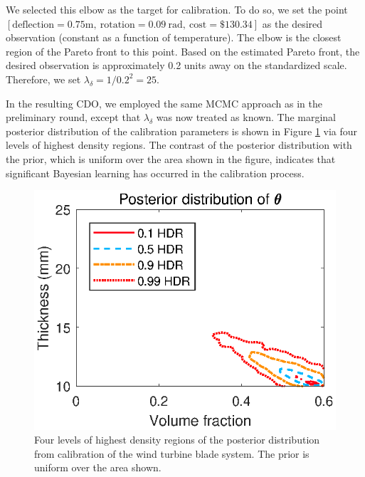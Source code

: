 \documentclass[12pt]{article}
\begin{document}
%
We selected this elbow as the target for calibration.
%
To do so, we set the point $[\mathrm{deflection}=0.75\mathrm m,\ 
\mathrm{rotation}=0.09\ \mathrm{rad},\ 
\mathrm{cost}=\$130.34]$
 as the desired observation (constant as a function of temperature).
%
The elbow is the closest region of the Pareto front to this point.
%
Based on the estimated Pareto front, the desired observation is approximately 0.2 units away on the standardized scale.
%
Therefore, we set $\lambda_\delta=1/0.2^2=25.$
%

In the resulting CDO, we employed the same MCMC approach as in the preliminary round, except that $\lambda_\delta$ was now treated as known.
%
The marginal posterior distribution of the calibration parameters is shown in Figure \ref{fig:wt_marg_post} via four levels of highest density regions.
%
The contrast of the posterior distribution with the prior, which is uniform over the area shown in the figure, indicates that significant Bayesian learning has occurred in the calibration process.
%
\begin{figure}
\centering
\includegraphics[scale=0.8]{FIG_post_dist_contourplot}
\caption{Four levels of highest density regions of the posterior distribution from calibration of the wind turbine blade system. The prior is uniform over the area shown.}
\label{fig:wt_marg_post}
\end{figure}
\end{document}
